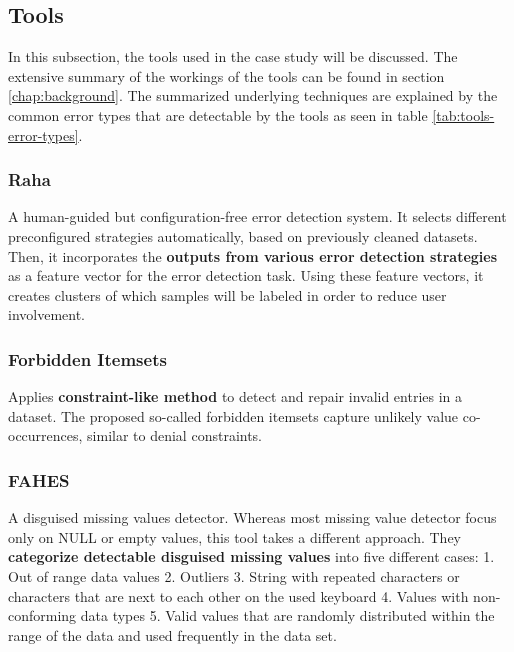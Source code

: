 \subsection{Tools}
\label{subsec:tools}
In this subsection, the tools used in the case study will be discussed. The extensive summary of the workings of the tools can be found in section \ref{chap:background}. The summarized underlying techniques are explained by the common error types that are detectable by the tools as seen in table \ref{tab:tools-error-types}.

\subsubsection{Raha \cite{Mahdavi2019-zf}}
A human-guided but configuration-free error detection system. It selects different preconfigured strategies automatically, based on previously cleaned datasets. Then, it incorporates the \textbf{outputs from various error detection strategies} as a feature vector for the error detection task. Using these feature vectors, it creates clusters of which samples will be labeled in order to reduce user involvement.

\subsubsection{Forbidden Itemsets \cite{Rammelaere2019-ea}}
Applies \textbf{constraint-like method} to detect and repair invalid entries in a dataset. The proposed so-called forbidden itemsets capture unlikely value co-occurrences, similar to denial constraints.

\subsubsection{FAHES \cite{Qahtan2018-te}}
A disguised missing values detector. Whereas most missing value detector focus only on NULL or empty values, this tool takes a different approach. They \textbf{categorize detectable disguised missing values} into five different cases: 1. Out of range data values 2. Outliers 3. String with repeated characters or characters that are next to each other on the used keyboard 4. Values with non-conforming data types 5. Valid values that are randomly distributed within the range of the data and used frequently in the data set.



